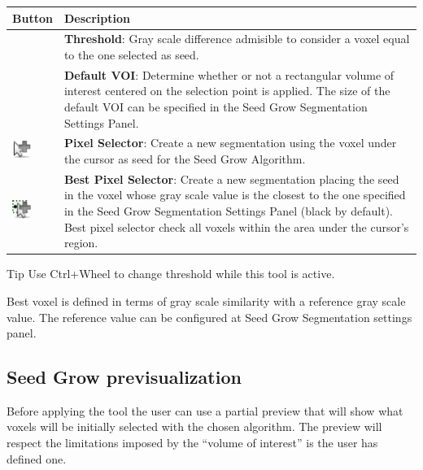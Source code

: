 \begin{tabular}{| m{1.3cm} | m{12cm} |}
\hline
\textbf{Button} & \textbf{Description}\\
\hline
& %
\textbf{Threshold}: Gray scale difference admisible to consider a voxel equal to
the one selected as seed. \\
\hline
& %
\textbf{Default VOI}: Determine whether or not a rectangular volume of interest
centered on the selection point is applied. The size of the default VOI can be
specified in the Seed Grow Segmentation Settings Panel.\\
\hline
\includegraphics[width=0.6cm]{../../frontend/toolbar/seedgrow/rsc/pixelSelector} &
\textbf{Pixel Selector}: Create a new segmentation using the voxel under the
cursor as seed for the Seed Grow Algorithm.\\
\hline
\includegraphics[width=0.6cm]{../../frontend/toolbar/seedgrow/rsc/bestPixelSelector} &
\textbf{Best Pixel Selector}: Create a new segmentation placing the seed in the
voxel whose gray scale value is the closest to the one specified in the Seed
Grow Segmentation Settings Panel (black by default). Best pixel selector check
all voxels within the area under the cursor's region.\\
\hline
\end{tabular}

\vspace{0.3cm}
\begin{bclogo}[couleur = yellow!33, logo= \bcbook]
{Tip} Use Ctrl+Wheel to change threshold while this tool is active.
\end{bclogo}
\vspace{0.3cm}

Best voxel is defined in terms of gray scale similarity with a
reference gray scale value. The reference value can be configured at Seed Grow
Segmentation settings panel.\\

\subsection{Seed Grow previsualization}

Before applying the tool the user can use a partial preview that will show what
voxels will be initially selected with the chosen algorithm. The preview will 
respect the limitations imposed by the ``volume of interest'' is the user has
defined one. \\

